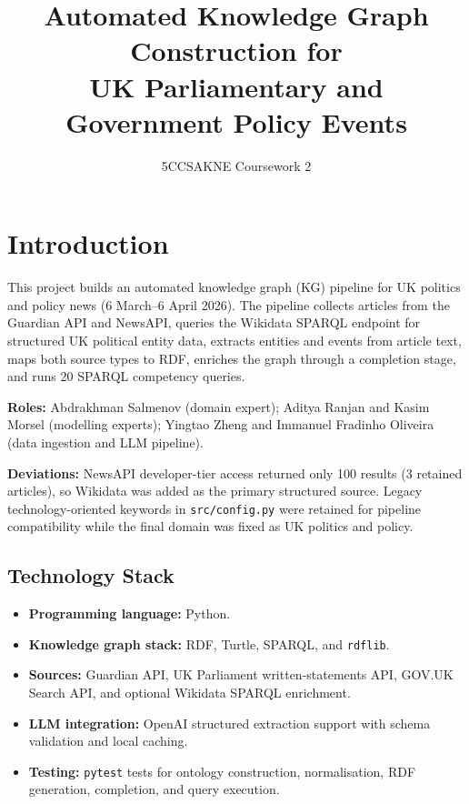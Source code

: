 \documentclass[runningheads]{llncs}
\newcommand{\filepath}[1]{%
  \begingroup\hypersetup{urlcolor=black}\nolinkurl{#1}\endgroup}
\newcommand{\code}[1]{\texttt{#1}}
\begin{document}
\title{Automated Knowledge Graph Construction for\\UK Parliamentary and Government Policy Events}
\author{5CCSAKNE Coursework 2}

\maketitle

\section{Introduction}\label{sec:introduction}

This project builds an automated knowledge graph (KG) pipeline for UK politics and
policy news (6 March--6 April 2026). The pipeline collects articles from the Guardian
API and NewsAPI, queries the Wikidata SPARQL endpoint for structured UK political
entity data, extracts entities and events from article text, maps both source types to
RDF, enriches the graph through a completion stage, and runs 20 SPARQL competency
queries.

\textbf{Roles:} Abdrakhman Salmenov (domain expert); Aditya Ranjan and Kasim Morsel
(modelling experts); Yingtao Zheng and Immanuel Fradinho Oliveira (data ingestion and
LLM pipeline).

\textbf{Deviations:} NewsAPI developer-tier access returned only 100 results (3 retained
articles), so Wikidata was added as the primary structured source. Legacy
technology-oriented keywords in \filepath{src/config.py} were retained for pipeline
compatibility while the final domain was fixed as UK politics and policy.

\subsection{Technology Stack}

\begin{itemize}[leftmargin=*,nosep]
    \item \textbf{Programming language:} Python.
    \item \textbf{Knowledge graph stack:} RDF, Turtle, SPARQL, and \code{rdflib}.
    \item \textbf{Sources:} Guardian API, UK Parliament written-statements API,
    GOV.UK Search API, and optional Wikidata SPARQL enrichment.
    \item \textbf{LLM integration:} OpenAI structured extraction support with
    schema validation and local caching.
    \item \textbf{Testing:} \code{pytest} tests for ontology construction,
    normalisation, RDF generation, completion, and query execution.
\end{itemize}
\end{document}
